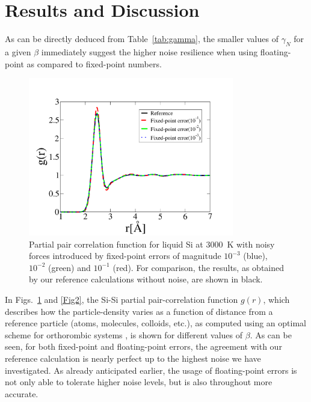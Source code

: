 \documentclass[preprint]{elsarticle}
\begin{document}
\section{Results and Discussion}
\label{sec:results}
As can be directly deduced from Table~\ref{tab:gamma}, the smaller values of $\gamma_N$ for a given $\beta$ immediately suggest the higher noise resilience when using floating-point as compared to fixed-point numbers.
\begin{figure}
\begin{center}
\includegraphics[width=0.8\textwidth]
{Fixed_point_rdf2.pdf}
\end{center}
\caption{\label{Fig1}
Partial pair correlation function for liquid Si at 3000~K with noisy forces introduced by fixed-point errors of magnitude $10^{-3}$ (blue), $10^{-2}$ (green) and $10^{-1}$ (red). For comparison, the results, as obtained by our reference calculations without noise, are shown in black.
} \end{figure}
In Figs.~\ref{Fig1} and \ref{Fig2}, the Si-Si partial pair-correlation function $g(r)$, which describes how the particle-density varies as a function of distance from a reference particle (atoms, molecules, colloids, etc.), as computed using an optimal scheme for orthorombic systems \cite{KAF}, is shown for different values of $\beta$.
As can be seen, for both fixed-point and floating-point errors, the agreement with our reference calculation is nearly perfect up to the highest noise we have investigated. As already anticipated earlier, the usage of floating-point errors is not only able to tolerate higher noise levels, but is also throughout more accurate.
\end{document}
